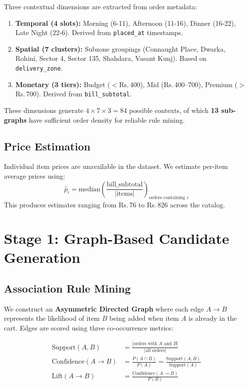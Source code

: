 \documentclass[10pt, twocolumn, a4paper]{article}
\newcommand{\Rs}{\textrm{Rs.\,}}
\begin{document}
Three contextual dimensions are extracted from order metadata:

\begin{enumerate}
    \item \textbf{Temporal (4 slots):} Morning (6-11), Afternoon (11-16), Dinner (16-22), Late Night (22-6). Derived from \texttt{placed\_at} timestamps.
    \item \textbf{Spatial (7 clusters):} Subzone groupings (Connaught Place, Dwarka, Rohini, Sector 4, Sector 135, Shahdara, Vasant Kunj). Based on \texttt{delivery\_zone}.
    \item \textbf{Monetary (3 tiers):} Budget ($<$\Rs400), Mid (\Rs400--700), Premium ($>$\Rs700). Derived from \texttt{bill\_subtotal}.
\end{enumerate}

These dimensions generate $4 \times 7 \times 3 = 84$ possible contexts, of which \textbf{13 sub-graphs} have sufficient order density for reliable rule mining.

\subsection{Price Estimation}

Individual item prices are unavailable in the dataset. We estimate per-item average prices using:
$$\hat{p}_i = \text{median}\left(\frac{\text{bill\_subtotal}}{|\text{items}|}\right)_{\text{orders containing } i}$$
This produces estimates ranging from \Rs76 to \Rs826 across the catalog.

\section{Stage 1: Graph-Based Candidate Generation}

\subsection{Association Rule Mining}

We construct an \textbf{Asymmetric Directed Graph} where each edge $A \to B$ represents the likelihood of item $B$ being added when item $A$ is already in the cart. Edges are scored using three co-occurrence metrics:

\begin{align}
\text{Support}(A, B) &= \frac{|\text{orders with } A \text{ and } B|}{|\text{all orders}|} \label{eq:support}\\[3pt]
\text{Confidence}(A \!\to\! B) &= \frac{P(A \cap B)}{P(A)} = \frac{\text{Support}(A,B)}{\text{Support}(A)} \label{eq:conf}\\[3pt]
\text{Lift}(A \!\to\! B) &= \frac{\text{Confidence}(A \!\to\! B)}{P(B)} \label{eq:lift}
\end{align}
\end{document}

